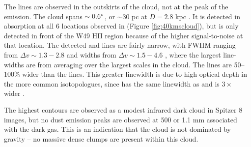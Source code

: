 The \formaldehyde lines are observed in the outskirts of the cloud, not at
the peak of the \thirteenco emission.  The cloud spans $\sim0.6^{\circ}$, or
$\sim30$ pc at $D=2.8$ kpc \citep{Roman-Duval2009a}.  It is detected in \oneone
absorption at all 6 locations observed in \formaldehyde (Figure
\ref{fig:40kmscloud}), but \twotwo is only detected in front of the W49 HII
region because of the higher signal-to-noise at that location.  The detected
\thirteenco and \formaldehyde lines are fairly narrow, with \formaldehyde FWHM
ranging from $\Delta v \sim1.3-2.8$ \kms and \thirteenco widths from $\Delta v
\sim1.5-4.6$ \kms, where the largest line-widths are from averaging over the
largest scales in the cloud.  The \thirteenco lines are 50--100\% wider than the
\formaldehyde lines.  This greater linewidth is due to high optical depth in the
more common isotopologues, since \ceighteeno has the same linewidth as \formaldehyde
and \twelveco is $3\times$ wider \citep[][their Table 4]{Plume2004a}.

The highest \thirteenco contours are observed as a modest infrared dark cloud
in Spitzer 8 \um images, but no dust emission peaks are observed at 500 \um
\citep[Herschel;][]{Traficante2011a} or 1.1 mm
\citep[Bolocam;][]{Aguirre2011a,Ginsburg2013a} associated with the dark gas.
This is an indication that the cloud is not dominated by gravity -- no
massive dense clumps are present within this cloud.


